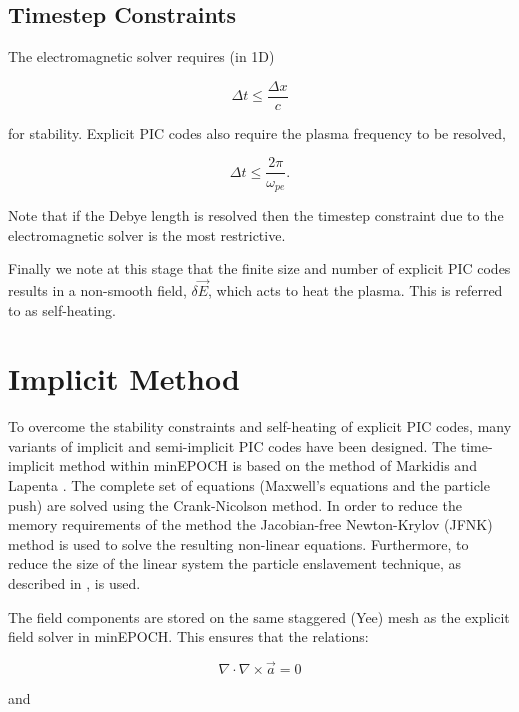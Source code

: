 \documentclass{article}
\begin{document}
\subsection{Timestep Constraints}

The electromagnetic solver requires (in 1D)

\begin{equation}
  \Delta t \leq \frac{\Delta x}{c}
\end{equation}

for stability. Explicit PIC codes also require the plasma frequency to be resolved,

\begin{equation}
  \Delta t \leq \frac{2 \pi}{\omega_{pe}}.
\end{equation}

Note that if the Debye length is resolved then the timestep constraint due to the electromagnetic solver is the most restrictive.

Finally we note at this stage that the finite size and number of explicit PIC codes results in a non-smooth field, $\delta \vec{E}$, which acts to heat the plasma. This is referred to as self-heating.

\section{Implicit Method}

To overcome the stability constraints and self-heating of explicit PIC codes, many variants of implicit and semi-implicit PIC codes have been designed. The time-implicit method within minEPOCH is based on the method of Markidis and Lapenta \cite{markidis}. The complete set of equations (Maxwell's equations and the particle push) are solved using the Crank-Nicolson method. In order to reduce the memory requirements of the method the Jacobian-free Newton-Krylov (JFNK) method is used to solve the resulting non-linear equations. Furthermore, to reduce the size of the linear system the particle enslavement technique, as described in \cite{markidis},\cite{chen} is used.

The field components are stored on the same staggered (Yee) mesh as the explicit field solver in minEPOCH. This ensures that the relations:

\begin{equation}
  \nabla \cdot \nabla \times \vec{a} = 0
\end{equation}

and
\end{document}
